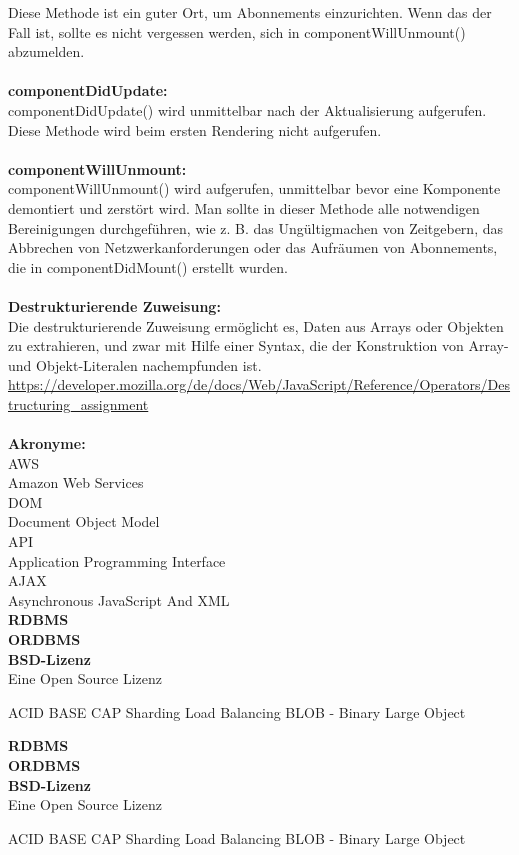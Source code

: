Diese Methode ist ein guter Ort, um Abonnements einzurichten. Wenn das der Fall ist, sollte es nicht vergessen werden, sich in componentWillUnmount() abzumelden.
\\\\
\textbf{componentDidUpdate:}\\
componentDidUpdate() wird unmittelbar nach der Aktualisierung aufgerufen. Diese Methode wird beim ersten Rendering nicht aufgerufen.
\\\\
\textbf{componentWillUnmount:}\\
componentWillUnmount() wird aufgerufen, unmittelbar bevor eine Komponente demontiert und zerstört wird. Man sollte in dieser Methode alle notwendigen Bereinigungen durchgeführen, wie z. B. das Ungültigmachen von Zeitgebern, das Abbrechen von Netzwerkanforderungen oder das Aufräumen von Abonnements, die in componentDidMount() erstellt wurden.
\\\\
\textbf{Destrukturierende Zuweisung:}\\
Die destrukturierende Zuweisung ermöglicht es, Daten aus Arrays oder Objekten zu extrahieren, und zwar mit Hilfe einer Syntax, die der Konstruktion von Array- und Objekt-Literalen nachempfunden ist.
\url{https://developer.mozilla.org/de/docs/Web/JavaScript/Reference/Operators/Destructuring_assignment}
\\\\
\textbf{Akronyme:}\\
{AWS}\\{Amazon Web Services}\\
{DOM}\\{Document Object Model}\\
{API}\\{Application Programming Interface}\\
{AJAX}\\{Asynchronous JavaScript And XML}\\

\textbf{RDBMS}\\
\textbf{ORDBMS}\\
\textbf{BSD-Lizenz}\\
Eine Open Source Lizenz

ACID
BASE
CAP
Sharding
Load Balancing
BLOB - Binary Large Object

\textbf{RDBMS}\\
\textbf{ORDBMS}\\
\textbf{BSD-Lizenz}\\
Eine Open Source Lizenz

ACID
BASE
CAP
Sharding
Load Balancing
BLOB - Binary Large Object


